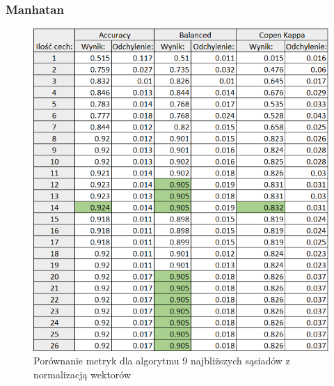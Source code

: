 \documentclass[12pt]{article}
\begin{document}
\subsubsection{Manhatan}
\begin{figure}[H]
	\centering
		\includegraphics[scale=0.9]{images/metrics/9nn_manhatan_norm_tab.png}
	\caption{Porównanie metryk dla algorytmu 9 najbliższych sąsiadów z normalizacją wektorów}
\end{figure}
\end{document}
